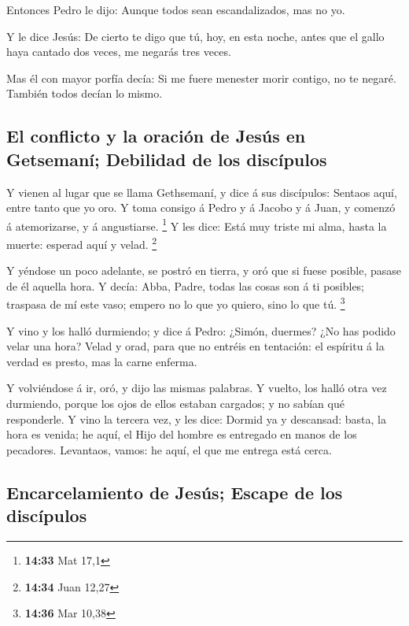  Entonces Pedro le dijo: Aunque todos sean escandalizados,
mas no yo.

 Y le dice Jesús: De cierto te digo que tú, hoy, en esta
noche, antes que el gallo haya cantado dos veces, me negarás tres veces.

 Mas él con mayor porfía decía: Si me fuere menester morir
contigo, no te negaré. También todos decían lo mismo.

\hypertarget{el-conflicto-y-la-oraciuxf3n-de-jesuxfas-en-getsemanuxed-debilidad-de-los-discuxedpulos}{%
\subsection{El conflicto y la oración de Jesús en Getsemaní; Debilidad
de los
discípulos}\label{el-conflicto-y-la-oraciuxf3n-de-jesuxfas-en-getsemanuxed-debilidad-de-los-discuxedpulos}}

 Y vienen al lugar que se llama Gethsemaní, y dice á sus
discípulos: Sentaos aquí, entre tanto que yo oro.  Y toma
consigo á Pedro y á Jacobo y á Juan, y comenzó á atemorizarse, y á
angustiarse. \footnote{\textbf{14:33} Mat 17,1}  Y les
dice: Está muy triste mi alma, hasta la muerte: esperad aquí y velad.
\footnote{\textbf{14:34} Juan 12,27}

 Y yéndose un poco adelante, se postró en tierra, y oró que
si fuese posible, pasase de él aquella hora.  Y decía:
Abba, Padre, todas las cosas son á ti posibles; traspasa de mí este
vaso; empero no lo que yo quiero, sino lo que tú. \footnote{\textbf{14:36}
  Mar 10,38}

 Y vino y los halló durmiendo; y dice á Pedro: ¿Simón,
duermes? ¿No has podido velar una hora?  Velad y orad, para
que no entréis en tentación: el espíritu á la verdad es presto, mas la
carne enferma.

 Y volviéndose á ir, oró, y dijo las mismas palabras.
 Y vuelto, los halló otra vez durmiendo, porque los ojos de
ellos estaban cargados; y no sabían qué responderle.  Y
vino la tercera vez, y les dice: Dormid ya y descansad: basta, la hora
es venida; he aquí, el Hijo del hombre es entregado en manos de los
pecadores.  Levantaos, vamos: he aquí, el que me entrega
está cerca.

\hypertarget{encarcelamiento-de-jesuxfas-escape-de-los-discuxedpulos}{%
\subsection{Encarcelamiento de Jesús; Escape de los
discípulos}\label{encarcelamiento-de-jesuxfas-escape-de-los-discuxedpulos}}

